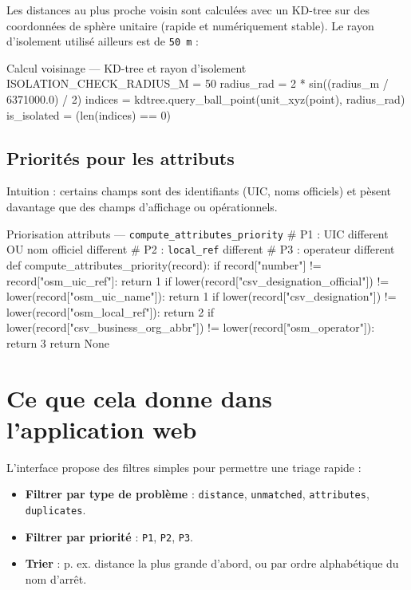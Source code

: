 \noindent Les distances au plus proche voisin sont calculées avec un KD-tree sur des coordonnées de sphère unitaire (rapide et numériquement stable). Le rayon d'isolement utilisé ailleurs est de \texttt{50 m} :

\begin{codebox}[language=Python]{Calcul voisinage — KD-tree et rayon d'isolement}
ISOLATION_CHECK_RADIUS_M = 50
radius_rad = 2 * sin((radius_m / 6371000.0) / 2)
indices = kdtree.query_ball_point(unit_xyz(point), radius_rad)
is_isolated = (len(indices) == 0)
\end{codebox}

\subsection{Priorités pour les attributs}
Intuition : certains champs sont des identifiants (UIC, noms officiels) et pèsent davantage que des champs d'affichage ou opérationnels.

\begin{codebox}[language=Python]{Priorisation attributs — \texttt{compute\_attributes\_priority}}
# P1 : UIC different OU nom officiel different
# P2 : \texttt{local_ref} different
# P3 : operateur different
def compute_attributes_priority(record):
    if record["number"] != record["osm_uic_ref"]:
        return 1
    if lower(record["csv_designation_official"]) != lower(record["osm_uic_name"]):
        return 1
    if lower(record["csv_designation"]) != lower(record["osm_local_ref"]):
        return 2
    if lower(record["csv_business_org_abbr"]) != lower(record["osm_operator"]):
        return 3
    return None
\end{codebox}

\section{Ce que cela donne dans l'application web}
L'interface propose des filtres simples pour permettre une triage rapide :
\begin{itemize}
  \item \textbf{Filtrer par type de problème} : \texttt{distance}, \texttt{unmatched}, \texttt{attributes}, \texttt{duplicates}.
  \item \textbf{Filtrer par priorité} : \texttt{P1}, \texttt{P2}, \texttt{P3}.
  \item \textbf{Trier} : p. ex. distance la plus grande d'abord, ou par ordre alphabétique du nom d'arrêt.
\end{itemize}

